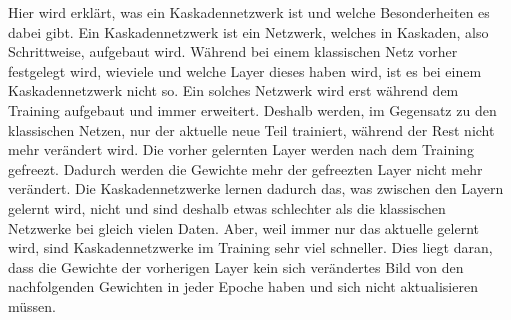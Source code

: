 Hier wird erklärt, was ein Kaskadennetzwerk ist und welche Besonderheiten es dabei gibt. 
Ein Kaskadennetzwerk ist ein Netzwerk, welches in Kaskaden, also Schrittweise, aufgebaut wird. Während bei einem klassischen Netz 
vorher festgelegt wird, wieviele und welche Layer dieses haben wird, ist es bei einem Kaskadennetzwerk nicht so. Ein solches Netzwerk 
wird erst während dem Training aufgebaut und immer erweitert. Deshalb werden, im Gegensatz zu den klassischen Netzen, nur der aktuelle neue 
Teil trainiert, während der Rest nicht mehr verändert wird. Die vorher gelernten Layer werden nach dem Training gefreezt. Dadurch 
werden die Gewichte mehr der gefreezten Layer nicht mehr verändert. Die Kaskadennetzwerke lernen dadurch das, was zwischen den Layern 
gelernt wird, nicht und sind deshalb etwas schlechter als die klassischen Netzwerke bei gleich vielen Daten. Aber, weil immer nur das 
aktuelle gelernt wird, sind Kaskadennetzwerke im Training sehr viel schneller. Dies liegt daran, dass die Gewichte der vorherigen Layer 
kein sich verändertes Bild von den nachfolgenden Gewichten in jeder Epoche haben und sich nicht aktualisieren müssen. 
